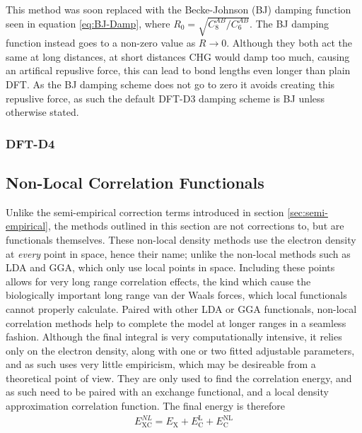 \documentclass[10pt,a4paper,twocolumn,twoside]{extarticle}
\begin{document}
	This method was soon replaced with the Becke-Johnson (BJ) damping function\cite{BJ-Damp} seen in equation \ref{eq:BJ-Damp}, where $R_0 = \sqrt{C_8^{AB}/C_6^{AB}}$. The BJ damping function instead goes to a non-zero value as $R \rightarrow 0$. Although they both act the same at long distances, at short distances CHG would damp too much, causing an artifical repuslive force, this can lead to bond lengths even longer than plain DFT. As the BJ damping scheme does not go to zero it avoids creating this repuslive force, as such the default DFT-D3 damping scheme is BJ unless otherwise stated.\cite{D3-Damp}

	\subsubsection{DFT-D4}
	

	\subsection{Non-Local Correlation Functionals}
	\label{sec:NL}
	Unlike the semi-empirical correction terms introduced in section \ref{sec:semi-empirical}, the methods outlined in this section are not corrections to, but are functionals themselves. These non-local density methods use the electron density at \emph{every} point in space, hence their name; unlike the non-local methods such as LDA and GGA, which only use local points in space. Including these points allows for very long range correlation effects, the kind which cause the biologically important long range van der Waals forces, which local functionals cannot properly calculate. Paired with other LDA or GGA functionals, non-local correlation methods help to complete the model at longer ranges in a seamless fashion. Although the final integral is very computationally intensive, it relies only on the electron density, along with one or two fitted adjustable parameters, and as such uses very little empiricism, which may be desireable from a theoretical point of view. They are only used to find the correlation energy, and as such need to be paired with an exchange functional, and a local density approximation correlation function. The final energy is therefore
	\begin{align}
		E_\text{XC}^{NL} = E_\text{X} + E_\text{C}^\text{L} + E_\text{C}^\text{NL}
	\end{align} 
\end{document}
